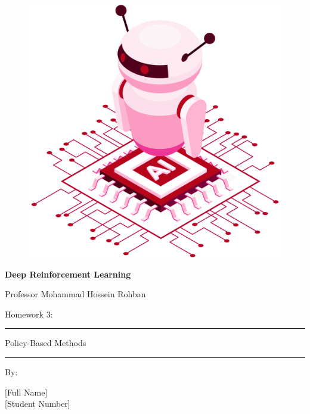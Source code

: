 \documentclass[12pt]{article}
\begin{document}
\thispagestyle{plain}

\begin{center}

\vspace*{-1.5cm}
\begin{figure}[!h]
    \centering
    \includegraphics[width=0.7\linewidth]{figs/cover-std.png}
\end{figure}

{

{\color{DarkBlue} {\fontsize{30}{50} \textbf{
Deep Reinforcement Learning
}}}

{\color{DarkBlue} {\Large
Professor Mohammad Hossein Rohban
}}
}


\vspace{20pt}

{


{\color{RedOrange}
{\Large
Homework 3:
}\\
}
{\color{BrickRed}
\rule{12cm}{0.5pt}

{\Huge
Policy-Based Methods
}
\rule{12cm}{0.5pt}
}

\vspace{10pt}

{\color{RoyalPurple} { \small By:} } \\
\vspace{10pt}

{\color{Blue} { \LARGE [Full Name] } } \\
\vspace{5pt}
{\color{RoyalBlue} { \Large [Student Number] } }


}
\end{center}
\end{document}
